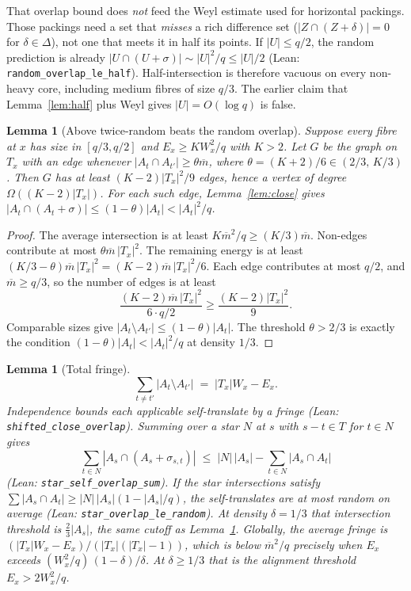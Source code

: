 \documentclass[11pt]{article}
\newtheorem{lemma}[theorem]{Lemma}
\theoremstyle{definition}
\begin{document}
That overlap bound does \emph{not} feed the Weyl estimate used for horizontal packings.
Those packings need a set that \emph{misses} a rich difference set
($|Z\cap(Z+\delta)|=0$ for $\delta\in\Delta$), not one that meets it in half its points.
If $|U|\le q/2$, the random prediction is already
$|U\cap(U+\sigma)|\sim|U|^{2}/q\le|U|/2$
(Lean: \texttt{random\_overlap\_le\_half}).
Half-intersection is therefore vacuous on every non-heavy core, including
medium fibres of size $q/3$.
The earlier claim that Lemma~\ref{lem:half} plus Weyl gives $|U|=O(\log q)$
is false.

\begin{lemma}[Above twice-random beats the random overlap]\label{lem:Kstar}
Suppose every fibre at $x$ has size in $[q/3,q/2]$ and
$E_x\ge K W_x^{2}/q$ with $K>2$.
Let $G$ be the graph on $T_x$ with an edge whenever
$|A_t\cap A_{t'}|\ge\theta\overline m$, where
$\theta=(K+2)/6\in(2/3,\,K/3)$.
Then $G$ has at least $(K-2)|T_x|^{2}/9$ edges, hence a vertex of degree
$\Omega((K-2)|T_x|)$.
For each such edge, Lemma~\ref{lem:close} gives
$|A_t\cap(A_t+\sigma)|\le(1-\theta)|A_t|<|A_t|^{2}/q$.
\end{lemma}

\begin{proof}
The average intersection is at least $K\overline m^{2}/q\ge(K/3)\overline m$.
Non-edges contribute at most $\theta\overline m\,|T_x|^{2}$.
The remaining energy is at least
$(K/3-\theta)\overline m\,|T_x|^{2}=(K-2)\overline m\,|T_x|^{2}/6$.
Each edge contributes at most $q/2$, and $\overline m\ge q/3$, so the number
of edges is at least
\[
  \frac{(K-2)\overline m\,|T_x|^{2}}{6\cdot q/2}
  \ge
  \frac{(K-2)|T_x|^{2}}{9}.
\]
Comparable sizes give $|A_t\setminus A_{t'}|\le(1-\theta)|A_t|$.
The threshold $\theta>2/3$ is exactly the condition
$(1-\theta)|A_t|<|A_t|^{2}/q$ at density $1/3$.
\end{proof}

\begin{lemma}[Total fringe]\label{lem:fringe}
\[
  \sum_{t\neq t'}|A_t\setminus A_{t'}|
  \;=\;
  |T_x|W_x-E_x.
\]
Independence bounds each applicable self-translate by a fringe
(Lean: \texttt{shifted\_close\_overlap}).
Summing over a star $N$ at $s$ with $s-t\in T$ for $t\in N$ gives
\[
  \sum_{t\in N}|A_s\cap(A_s+\sigma_{s,t})|
  \;\le\;
  |N|\,|A_s|-\sum_{t\in N}|A_s\cap A_t|
\]
(Lean: \texttt{star\_self\_overlap\_sum}).
If the star intersections satisfy
$\sum|A_s\cap A_t|\ge|N|\,|A_s|(1-|A_s|/q)$, the self-translates are
at most random on average
(Lean: \texttt{star\_overlap\_le\_random}).
At density $\delta=1/3$ that intersection threshold is $\tfrac23|A_s|$,
the same cutoff as Lemma~\ref{lem:Kstar}.
Globally, the average fringe is
$(|T_x|W_x-E_x)/(|T_x|(|T_x|-1))$, which is below $\overline m^{2}/q$
precisely when $E_x$ exceeds
$(W_x^{2}/q)\,(1-\delta)/\delta$.
At $\delta\ge 1/3$ that is the alignment threshold $E_x>2W_x^{2}/q$.
\end{lemma}
\end{document}
